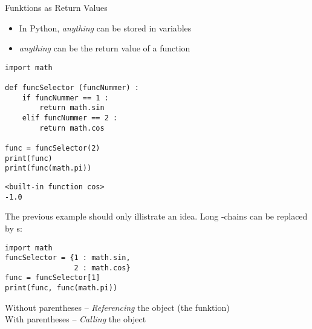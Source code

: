 \begin{frame}[fragile]{Funktions as Return Values}
%
\begin{itemize}
\item In Python, \emph{anything} can be stored in variables
\item[\Thus] \emph{anything} can be the return value of a function
\end{itemize}
%
\begin{tcbraster}[raster columns=2,
                  raster equal height,
                  nobeforeafter,
                  raster column skip=0.5cm]
\begin{codebox}
\begin{verbatim}
import math

def funcSelector (funcNummer) :
    if funcNummer == 1 :
        return math.sin
    elif funcNummer == 2 :
        return math.cos

func = funcSelector(2)
print(func)
print(func(math.pi))
\end{verbatim}
\end{codebox}
%
\begin{cmdbox}
\begin{verbatim}
<built-in function cos>
-1.0
\end{verbatim}
\end{cmdbox}
\end{tcbraster}
%
\end{frame}



\begin{frame}[fragile]
%
\begin{hintbox}
\scriptsize
The previous example should only illistrate an idea. Long  -chains can be replaced by s:

\begin{codebox}
\begin{verbatim}
import math
funcSelector = {1 : math.sin,
                2 : math.cos}
func = funcSelector[1]
print(func, func(math.pi))
\end{verbatim}
\end{codebox}
\end{hintbox}
%
\begin{hintbox}
Without parentheses -- \emph{Referencing} the object (\ie the funktion)\\
With parentheses -- \emph{Calling} the object
\end{hintbox}
%
\end{frame}

